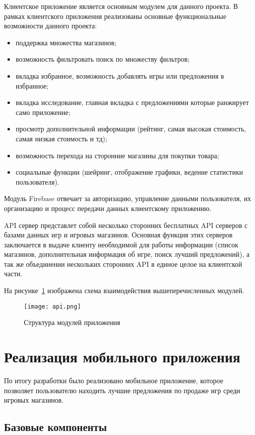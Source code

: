 Клиентское приложение является основным модулем для данного проекта. В рамках клиентского приложения реализованы основные функциональные возможности данного проекта:
\begin{itemize}
  \item поддержка множества магазинов;
  \item возможность фильтровать поиск по множеству фильтров;
  \item вкладка избранное, возможность добавлять игры или предложения в избранное;
  \item вкладка исследование, главная вкладка с предложениями которые ранжирует само приложение;
  \item просмотр дополнительной информации (рейтинг, самая высокая стоимость, самая низкая стоимость и тд);
  \item возможность перехода на сторонние магазины для покупки товара;
  \item социальные функции (шейринг, отображение графики, ведение статистики пользователя).
\end{itemize}
 
Модуль Firebase отвечает за авторизацию, управление данными пользователя, их организацию и процесс передачи данных клиентскому приложению.
 
API сервер представлет собой несколько сторонних бесплатных API серверов с базами данных игр и игровых магазинов. Основная функция этих серверов заключается в выдаче клиенту необходимой для работы информации (список магазинов, дополнительная информация об игре, поиск лучший предложений), а так же объединении нескольких сторонних API в единое целое на клиентской части.
 
На рисунке~\ref{fig:arch:modules_scheme} изображена схема взаимодействия вышеперечисленных модулей.
 
\begin{figure}[H]
 \centering
   \texttt{[image: api.png]} 
   \caption{Структура модулей приложения}
   \label{fig:arch:modules_scheme}
\end{figure}
 
\section{Реализация мобильного приложения}
\label{sec:code}
По итогу разработки было реализовано мобильное приложение, которое позволяет пользователю находить лучшие предложения по продаже игр среди игровых магазинов.

\subsection{Базовые компоненты}

